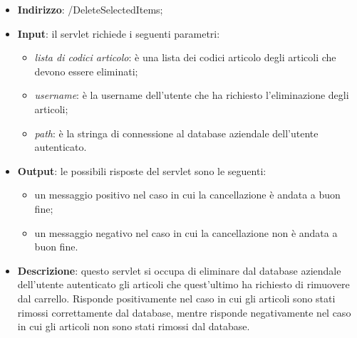 \begin{itemize}
	\item \textbf{Indirizzo}: /DeleteSelectedItems;
	\item \textbf{Input}: il servlet richiede i seguenti parametri:
		\begin{itemize}
			\item \textit{lista di codici articolo}: è una lista dei codici articolo degli articoli che devono essere eliminati;
			\item \textit{username}: è la username dell'utente che ha richiesto l'eliminazione degli articoli;
			\item \textit{path}: è la stringa di connessione al database aziendale dell'utente autenticato.
		\end{itemize}
	\item \textbf{Output}: le possibili risposte del servlet sono le seguenti:
		\begin{itemize}
			\item un messaggio positivo nel caso in cui la cancellazione è andata a buon fine;
			\item un messaggio negativo nel caso in cui la cancellazione non è andata a buon fine.
		\end{itemize}
	\item \textbf{Descrizione}: questo servlet si occupa di eliminare dal database aziendale dell'utente autenticato gli articoli che quest'ultimo ha richiesto di rimuovere dal carrello. Risponde positivamente nel caso in cui gli articoli sono stati rimossi correttamente dal database, mentre risponde negativamente nel caso in cui gli articoli non sono stati rimossi dal database.
\end{itemize}


